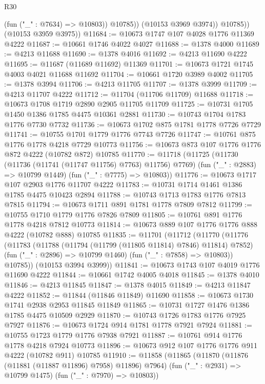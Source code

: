 \begin{lexlean}{R30}
\begin{coremodule}
                  (fun ("_" : @7634) => @10803))
                @10785))
            (@10153 @3969 @3974))
          @10785))
      (@10153 @3959 @3975))
@11684 := @10673 @1747 @107 @4028 @1776 @11369 @4222
@11687 := @10661 @1746 @4022 @4027
@11688 := @1378 @4000
@11689 := @4213 @11688
@11690 := @1378 @4016
@11692 := @4213 @11690 @4222
@11695 := @11687 (@11689 @11692) @11369
@11701 := @10673 @1721 @1745 @4003 @4021 @11688 @11692
@11704 := @10661 @1720 @3989 @4002
@11705 := @1378 @3994
@11706 := @4213 @11705
@11707 := @1378 @3999
@11709 := @4213 @11707 @4222
@11712 := @11704 (@11706 @11709) @11688
@11718 := @10673 @1708 @1719 @2890 @2905 @11705 @11709
@11725 := @10731 @1705 @1450 @1386 @1785 @4475 @10361 @2881
@11730 := @10743 @1704 @1783 @1776 @7730 @7732
@11736 := @10673 @1702 @875 @1781 @1778 @7726 @7729
@11741 := @10755 @1701 @1779 @1776 @7743 @7726
@11747 := @10761 @875 @1776 @1778 @4218 @7729 @10773
@11756 := @10673 @873 @107 @1776 @1776 @872 @4222 (@10782 @872) @10785
@11770 := @11718
    (@11725
      (@11730 (@11736 (@11741 (@11747 @11756) @7763) @11756) @7769)
      (fun ("_" : @2883) => @10799 @1449)
      (fun ("_" : @7775) => @10803))
@11776 := @10673 @1717 @107 @2903 @1776 @11707 @4222
@11783 := @10731 @1714 @1461 @1386 @1785 @4475 @10423 @2894
@11788 := @10743 @1713 @1783 @1776 @7813 @7815
@11794 := @10673 @1711 @891 @1781 @1778 @7809 @7812
@11799 := @10755 @1710 @1779 @1776 @7826 @7809
@11805 := @10761 @891 @1776 @1778 @4218 @7812 @10773
@11814 := @10673 @889 @107 @1776 @1776 @888 @4222 (@10782 @888) @10785
@11835 := @11701
    (@11712
      (@11770
        (@11776
          (@11783
            (@11788 (@11794 (@11799 (@11805 @11814) @7846) @11814) @7852)
            (fun ("_" : @2896) => @10799 @1460)
            (fun ("_" : @7858) => @10803))
          @10785))
      (@10153 @3994 @3999))
@11841 := @10673 @1743 @107 @4019 @1776 @11690 @4222
@11844 := @10661 @1742 @4005 @4018
@11845 := @1378 @4010
@11846 := @4213 @11845
@11847 := @1378 @4015
@11849 := @4213 @11847 @4222
@11852 := @11844 (@11846 @11849) @11690
@11858 := @10673 @1730 @1741 @2938 @2953 @11845 @11849
@11865 := @10731 @1727 @1476 @1386 @1785 @4475 @10509 @2929
@11870 := @10743 @1726 @1783 @1776 @7925 @7927
@11876 := @10673 @1724 @914 @1781 @1778 @7921 @7924
@11881 := @10755 @1723 @1779 @1776 @7938 @7921
@11887 := @10761 @914 @1776 @1778 @4218 @7924 @10773
@11896 := @10673 @912 @107 @1776 @1776 @911 @4222 (@10782 @911) @10785
@11910 := @11858
    (@11865
      (@11870 (@11876 (@11881 (@11887 @11896) @7958) @11896) @7964)
      (fun ("_" : @2931) => @10799 @1475)
      (fun ("_" : @7970) => @10803))

\end{coremodule}
\end{lexlean}
